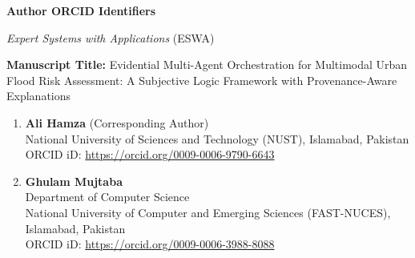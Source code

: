 \documentclass[11pt,a4paper]{article}
\begin{document}
\thispagestyle{empty}

\begin{center}
{\Large \bf Author ORCID Identifiers \par}
\vspace{0.5em}
{\large \textit{Expert Systems with Applications} (ESWA) \par}
\end{center}

\vspace{2em}

\noindent \textbf{Manuscript Title:} Evidential Multi-Agent Orchestration for Multimodal Urban Flood Risk Assessment: A Subjective Logic Framework with Provenance-Aware Explanations

\vspace{2em}

\begin{enumerate}[leftmargin=*,itemsep=1.5em]
    \item \textbf{Ali Hamza} (Corresponding Author) \\
    National University of Sciences and Technology (NUST), Islamabad, Pakistan \\
    ORCID iD: \href{https://orcid.org/0009-0006-9790-6643}{https://orcid.org/0009-0006-9790-6643}

    \item \textbf{Ghulam Mujtaba} \\
    Department of Computer Science \\
    National University of Computer and Emerging Sciences (FAST-NUCES), Islamabad, Pakistan \\
    ORCID iD: \href{https://orcid.org/0009-0006-3988-8088}{https://orcid.org/0009-0006-3988-8088}
\end{enumerate}
\end{document}
